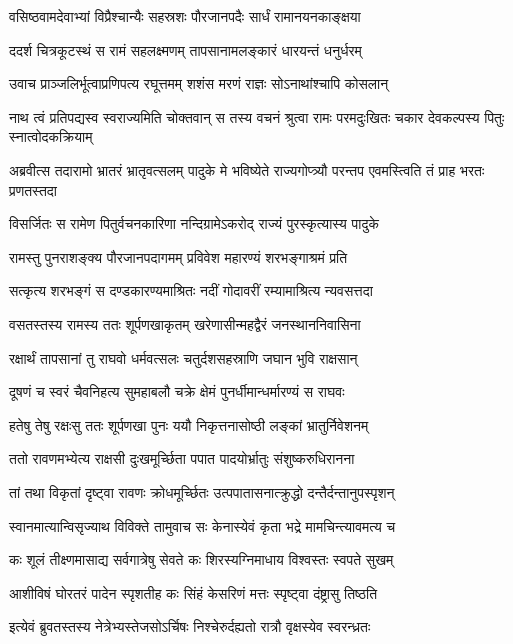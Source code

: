 \twolineshloka
{वसिष्ठवामदेवाभ्यां विप्रैश्चान्यैः सहस्रशः}
{पौरजानपदैः सार्धं रामानयनकाङ्क्षया}


\twolineshloka
{ददर्श चित्रकूटस्थं स रामं सहलक्ष्मणम्}
{तापसानामलङ्कारं धारयन्तं धनुर्धरम्}


\twolineshloka
{उवाच प्राञ्जलिर्भूत्वाप्रणिपत्य रघूत्तमम्}
{शशंस मरणं राज्ञः सोऽनाथांश्चापि कोसलान्}


नाथ त्वं प्रतिपद्यस्व स्वराज्यमिति चोक्तवान्
\twolineshloka
{स तस्य वचनं श्रुत्वा रामः परमदुःखितः}
{चकार देवकल्पस्य पितुः स्नात्वोदकक्रियाम्}


\threelineshloka
{अब्रवीत्स तदारामो भ्रातरं भ्रातृवत्सलम्}
{पादुके मे भविष्येते राज्यगोप्त्र्यौ परन्तप}
{एवमस्त्विति तं प्राह भरतः प्रणतस्तदा}


\twolineshloka
{विसर्जितः स रामेण पितुर्वचनकारिणा}
{नन्दिग्रामेऽकरोद् राज्यं पुरस्कृत्यास्य पादुके}


\twolineshloka
{रामस्तु पुनराशङ्क्य पौरजानपदागमम्}
{प्रविवेश महारण्यं शरभङ्गाश्रमं प्रति}


\twolineshloka
{सत्कृत्य शरभङ्गं स दण्डकारण्यमाश्रितः}
{नदीं गोदावरीं रम्यामाश्रित्य न्यवसत्तदा}


\twolineshloka
{वसतस्तस्य रामस्य ततः शूर्पणखाकृतम्}
{खरेणासीन्महद्वैरं जनस्थाननिवासिना}


\twolineshloka
{रक्षार्थं तापसानां तु राघवो धर्मवत्सलः}
{चतुर्दशसहस्राणि जघान भुवि राक्षसान्}


\twolineshloka
{दूषणं च स्वरं चैवनिहत्य सुमहाबलौ}
{चक्रे क्षेमं पुनर्धीमान्धर्मारण्यं स राघवः}


\twolineshloka
{हतेषु तेषु रक्षःसु ततः शूर्पणखा पुनः}
{ययौ निकृत्तनासोष्ठी लङ्कां भ्रातुर्निवेशनम्}


\twolineshloka
{ततो रावणमभ्येत्य राक्षसी दुःखमूर्च्छिता}
{पपात पादयोर्भ्रातुः संशुष्करुधिरानना}


\twolineshloka
{तां तथा विकृतां दृष्ट्वा रावणः क्रोधमूर्च्छितः}
{उत्पपातासनात्क्रुद्धो दन्तैर्दन्तानुपस्पृशन्}


\twolineshloka
{स्वानमात्यान्विसृज्याथ विविक्ते तामुवाच सः}
{केनास्येवं कृता भद्रे मामचिन्त्यावमत्य च}


\twolineshloka
{कः शूलं तीक्ष्णमासाद्य सर्वगात्रेषु सेवते}
{कः शिरस्यग्निमाधाय विश्वस्तः स्वपते सुखम्}


\twolineshloka
{आशीविषं घोरतरं पादेन स्पृशतीह कः}
{सिंहं केसरिणं मत्तः स्पृष्ट्वा दंष्ट्रासु तिष्ठति}


\twolineshloka
{इत्येवं ब्रुवतस्तस्य नेत्रेभ्यस्तेजसोऽर्चिषः}
{निश्चेरुर्दह्यतो रात्रौ वृक्षस्येव स्वरन्ध्रतः}


